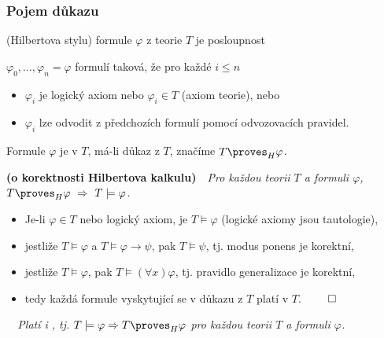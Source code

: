     
    
    \subsubsection*{Pojem důkazu}
     (\alert{Hilbertova stylu}) formule $\varphi$ z teorie $T$ je  posloupnost
    \smallskip
    
    $\varphi_0, \dots, \varphi_n=\varphi$ formulí taková, že pro každé $i\le n$
    \smallskip
    
    \begin{itemize}
    \item $\varphi_i$ je logický axiom nebo $\varphi_i \in T$ (axiom teorie), nebo
    \smallskip
    
    \item $\varphi_i$ lze odvodit z předchozích formulí pomocí odvozovacích pravidel.
    \end{itemize}
    \smallskip
    
    Formule $\varphi$ je  v $T$, má-li důkaz z $T$, značíme $T \proves_{H} \varphi$.
    \bigskip
    
    {\bf {} (o korektnosti Hilbertova kalkulu)}\ \ {\it  Pro každou teorii $T$ a formuli $\varphi$,\ \ $T\proves_H \varphi\ \Rightarrow\ T\models \varphi$.}
    \medskip
    
    {\it {}}
    \begin{itemize}
    \item Je-li $\varphi\in T$ nebo logický axiom, je $T \models \varphi$ (logické axiomy jsou tautologie),
    \item jestliže $T \models \varphi$ a $T \models \varphi \to \psi$, pak $T \models \psi$, \alert{tj. modus ponens je korektní},
    \item jestliže $T \models \varphi$, pak $T \models (\forall x)\varphi$, \alert{tj. pravidlo generalizace je korektní},
    \item tedy každá formule vyskytující se v důkazu z $T$ platí v $T$. $\qed$
    \end{itemize}
    \medskip
    
    {\it {}\ \ Platí i , tj. $T\models \varphi \Rightarrow T\proves_H \varphi$ pro každou teorii $T$ a formuli $\varphi$.}
